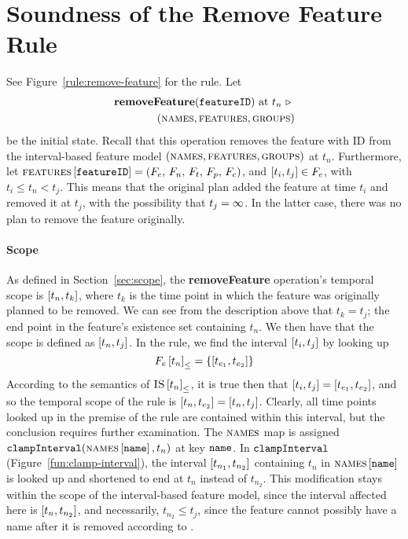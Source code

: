 \section{Soundness of the Remove Feature Rule}
\label{sec:soundness-of-the-remove-feature-rule}

See Figure~\vref{rule:remove-feature} for the  rule. 
Let 
\begin{equation*}
   \begin{split}
      \textbf{removeFeature}(\texttt{featureID})\text{ at } t_n
      \ \triangleright \  \\
   (\textsc{names}{}, \textsc{features}{}, \textsc{groups}{}{})
\end{split}
\end{equation*}
be the initial state. Recall that this operation removes the feature with ID  from the interval-based feature model $(\textsc{names}{}, \textsc{features}{}, \textsc{groups}{}{})$ at $t_n$. Furthermore, let $\textsc{features} \left[ \texttt{featureID} \right] = \left(F_e,\, F_n,\, F_t,\, F_p,\, F_c\right)$, and $\interval{t_i}{t_j} \in F_e$, with $t_i \leq t_n < t_j$. This means that the original plan added the feature at time $t_i$ and removed it at $t_j$, with the possibility that $t_j = \infty$. In the latter case, there was no plan to remove the feature originally.

\paragraph{Scope}
As defined in Section~\vref{sec:scope}, the \textbf{removeFeature} operation's temporal scope is $\interval{t_n}{t_k}$, where $t_k$ is the time point in which the feature was originally planned to be removed. We can see from the description above that $t_k = t_j$; the end point in the feature's existence set containing $t_n$. We then have that the scope is defined as $\interval{t_n}{t_j}$. In the rule, we find the interval $\interval{t_i}{t_j}$ by looking up
\begin{equation*}
   \containing{F_e}{t_n} = \set{\interval{t_{e_1}}{t_{e_2}}}
\end{equation*}
   According to the semantics of ${\textsc{IS} \left[ t_n \right]}_{\leq}$, it is true then that $\interval{t_i}{t_j} = \interval{t_{e_1}}{t_{e_2}}$, and so the temporal scope of the rule is $\interval{t_n}{t_{e_2}} = \interval{t_n}{t_j}$. Clearly, all time points looked up in the premise of the rule are contained within this interval, but the conclusion requires further examination. The $\textsc{names}{}$ map is assigned $\texttt{clampInterval}(\textsc{names} \left[ \texttt{name} \right], t_n)$ at key $\texttt{name}$. In $\texttt{clampInterval}$ (Figure~\vref{fun:clamp-interval}), the interval $\interval{t_{n_1}}{t_{n_2}}$ containing $t_n$ in $\textsc{names} \left[ \texttt{name} \right]$ is looked up and shortened to end at $t_n$ instead of $t_{n_2}$. This modification stays within the scope of the interval-based feature model, since the interval affected here is $\interval{t_n}{t_{n_2}}$, and necessarily, $t_{n_2} \leq t_j$, since the feature cannot possibly have a name after it is removed according to . 

